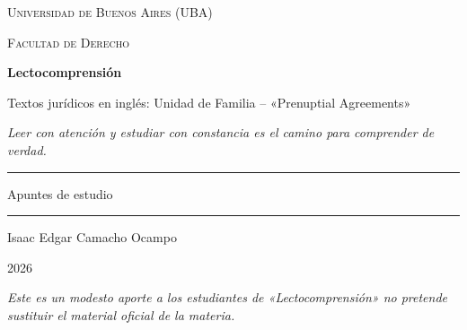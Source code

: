 \documentclass[12pt,oneside]{book}
\newcommand{\universidad}{Universidad de Buenos Aires (UBA)}
\newcommand{\facultad}{Facultad de Derecho}
\newcommand{\materia}{Lectocomprensión}
\newcommand{\titulo}{Textos jurídicos en inglés: Unidad de Familia -- «Prenuptial Agreements»}
\newcommand{\autor}{Isaac Edgar Camacho Ocampo}
\newcommand{\anio}{2026}
\begin{document}
\begin{titlepage}

\thispagestyle{empty}

\begin{center}

\vspace*{1cm}

{\large \textsc{\universidad}}

\vspace{0.2cm}

{\large \textsc{\facultad}}

\vspace{3cm}

{\Huge \textbf{\materia}}

\vspace{1cm}

{\LARGE \titulo}

\vspace{0.8cm}

\textit{Leer con atención y estudiar con constancia es el camino para comprender de verdad.}

\vspace{1.2cm}

\rule{0.70\textwidth}{0.5pt}

\vspace{0.5cm}

{\large Apuntes de estudio}

\vspace{0.5cm}

\rule{0.70\textwidth}{0.5pt}

\vfill

{\large \autor}

\vspace{0.3cm}

{\large \anio}

\end{center}

\vfill

\begin{flushleft}
\textit{Este es un modesto aporte a los estudiantes de «Lectocomprensión» no pretende sustituir el material oficial de la materia.}
\end{flushleft}

\end{titlepage}

\tableofcontents
\end{document}
